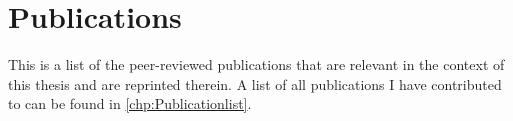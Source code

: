 \noindent
\begin{minipage}{\textwidth}
 
\chapter*{Publications}

This is a list of the peer-reviewed publications that are relevant in the context of this thesis and are reprinted therein. A list of all publications I have contributed to can be found in \autoref{chp:Publicationlist}.


\\

\\

\\

\\

\\




\end{minipage}